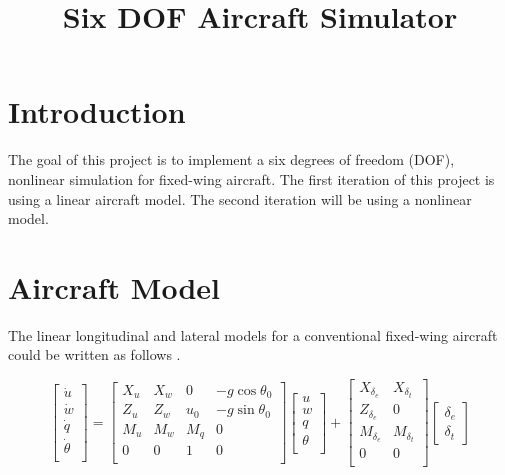 \documentclass{article}
\title{\textbf{Six DOF Aircraft Simulator}}
\begin{document}
\maketitle

\section{Introduction}
The goal of this project is to implement a six degrees of freedom (DOF), nonlinear simulation for fixed-wing aircraft. 
The first iteration of this project is using a linear aircraft model. The second iteration will be using a nonlinear model. 
   
\section{Aircraft Model}
The linear longitudinal and lateral models for a conventional fixed-wing aircraft could be written as follows \cite{Nelson}.

\begin{equation} \label{Eq:Linear_Long_sys}
    \begin{bmatrix}
    \dot{u} \\
    \dot{w} \\
    \dot{q} \\
    \dot{\theta} \\ 	
    \end{bmatrix}
    =
    \begin{bmatrix}
    X_u & X_w & 0 & -g \cos{\theta_0}\\
    Z_u & Z_w & u_0 & -g \sin{\theta_0}\\
    M_u & M_w & M_q & 0\\
    0 & 0 & 1 & 0 \\
    \end{bmatrix}
    \begin{bmatrix}
    u \\
    w \\
    q \\
    \theta \\ 	
    \end{bmatrix}
    +
    \begin{bmatrix}
    X_{\delta_e} & X_{\delta_t} \\
    Z_{\delta_e} & 0 \\
    M_{\delta_e} & M_{\delta_t} \\
    0 & 0\\ 	
    \end{bmatrix}
    \begin{bmatrix}
    {\delta_e} \\
    {\delta_t}  	
    \end{bmatrix}
\end{equation}
\end{document}
